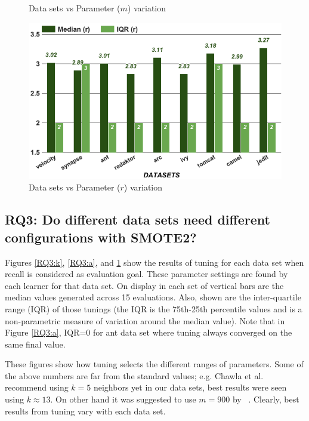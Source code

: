 \begin{figure}[!t]
\begin{minipage}{.33\textwidth}
        \caption{Data sets vs Parameter ($m$) variation}
        \label{RQ3:a}
    \end{minipage}
    \begin{minipage}{.33\textwidth}
        \captionsetup{labelsep=space,justification=centering,singlelinecheck=off}
        \includegraphics[width=.95\linewidth]{./fig/r.png}
        \caption{Data sets vs Parameter ($r$) variation}
        \label{RQ3:b}
    \end{minipage}
\end{figure}

\subsection{\textbf{RQ3: Do different data sets
      need different configurations with SMOTE2?}}

Figures \ref{RQ3:k}, \ref{RQ3:a}, and \ref{RQ3:b} show the results of tuning for each data set when recall is considered as evaluation goal. These parameter settings are found by each learner for that data set.
On display in each set of vertical bars are
the median values generated across 15 evaluations.
Also, shown are
the inter-quartile range (IQR) of those tunings (the IQR is the 75th-25th percentile values and is a non-parametric measure of variation
around the median value). Note that in Figure \ref{RQ3:a}, IQR=0 for  ant data set where tuning
          always converged on the same final value.

  These figures
show how tuning selects the different ranges  of
parameters.
Some of the above numbers are far from the standard values; e.g. Chawla et al.~\cite{chawla2002smote} recommend using $k=5$ neighbors yet in our data sets, best results were seen using $k \approx 13$. On other hand it was suggested to use $m=900$ by ~\cite{pears2014synthetic}.
Clearly,
best results from tuning
vary with each data set.

